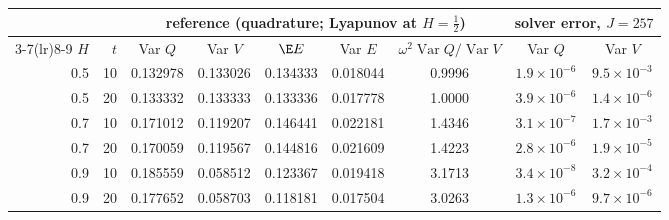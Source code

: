 \begin{tabular}{rrccccccc}\toprule
 & & \multicolumn{5}{c}{reference (quadrature; Lyapunov at $H=\frac12$)} & \multicolumn{2}{c}{solver error, $J=257$}\\\cmidrule(lr){3-7}\cmidrule(lr){8-9}
$H$ & $t$ & Var $Q$ & Var $V$ & $\E E$ & Var $E$ & $\omega^2\operatorname{Var} Q/\operatorname{Var} V$ & Var $Q$ & Var $V$\\\midrule
0.5 & 10 & 0.132978 & 0.133026 & 0.134333 & 0.018044 & 0.9996 & $1.9\times10^{-6}$ & $9.5\times10^{-3}$\\
0.5 & 20 & 0.133332 & 0.133333 & 0.133336 & 0.017778 & 1.0000 & $3.9\times10^{-6}$ & $1.4\times10^{-6}$\\
0.7 & 10 & 0.171012 & 0.119207 & 0.146441 & 0.022181 & 1.4346 & $3.1\times10^{-7}$ & $1.7\times10^{-3}$\\
0.7 & 20 & 0.170059 & 0.119567 & 0.144816 & 0.021609 & 1.4223 & $2.8\times10^{-6}$ & $1.9\times10^{-5}$\\
0.9 & 10 & 0.185559 & 0.058512 & 0.123367 & 0.019418 & 3.1713 & $3.4\times10^{-8}$ & $3.2\times10^{-4}$\\
0.9 & 20 & 0.177652 & 0.058703 & 0.118181 & 0.017504 & 3.0263 & $1.3\times10^{-6}$ & $9.7\times10^{-6}$\\
\bottomrule\end{tabular}
